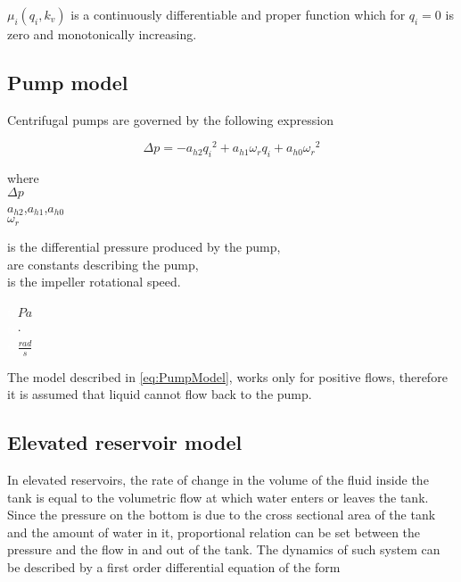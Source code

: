 $\mu_i(q_i,k_v)$ is a continuously differentiable and proper function which for $q_i = 0$ is zero and monotonically increasing.

\subsection{Pump model}
\label{pump_component}

Centrifugal pumps are governed by the following expression \cite{kallesoePHD}

\begin{equation}
  \Delta p = -a_{h2}{q_i}^2 + a_{h1} \omega_r q_i + a_{h0}{\omega_r}^2
  \label{eq:PumpModel}
\end{equation}

\begin{minipage}[t]{0.20\textwidth}
where\\
\hspace*{8mm} $\Delta p$ \\
\hspace*{8mm} $a_{h2}$,$a_{h1}$,$a_{h0}$ \\
\hspace*{8mm} $\omega_r$ 

\end{minipage}
\begin{minipage}[t]{0.68\textwidth}
\vspace*{2mm}
is the differential pressure produced by the pump,\\
are constants describing the pump,\\
is the impeller rotational speed.
\end{minipage}
\begin{minipage}[t]{0.10\textwidth}
\vspace*{2mm}
\textcolor{White}{te}$\unit{Pa}$\\
\textcolor{White}{te}$\unit{\cdot}$\\
\textcolor{White}{te}$\unit{\frac{rad}{s}}$
\end{minipage}  

The model described in \eqref{eq:PumpModel}, works only for positive flows, therefore it is assumed that liquid cannot flow back to the pump. 

\subsection{Elevated reservoir model}
\label{elevatedreservoir_component}

In elevated reservoirs, the rate of change in the volume of the fluid inside the tank is equal to the volumetric flow at which water enters or leaves the tank. Since the pressure on the bottom is due to the cross sectional area of the tank and the amount of water in it, proportional relation can be set between the pressure and the flow in and out of the tank. The dynamics of such system can be described by a first order differential equation of the form

